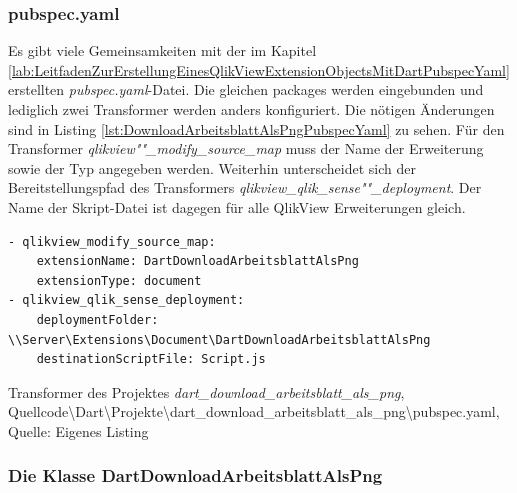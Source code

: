 \subsubsection{pubspec.yaml}

Es gibt viele Gemeinsam\-keiten mit der im Kapitel \ref{lab:LeitfadenZurErstellungEinesQlikViewExtensionObjectsMitDartPubspecYaml} erstellten \textit{pubspec.yaml}-Datei. Die gleichen packages werden eingebunden und lediglich zwei Transformer werden anders konfiguriert. Die nötigen Änderungen sind in Listing \ref{lst:DownloadArbeitsblattAlsPngPubspecYaml} zu sehen. Für den Transformer \textit{qlikview""\_modify\_source\_map} muss der Name der Erweiterung sowie der Typ angegeben werden. Weiterhin unterscheidet sich der Bereitstellungspfad des Transformers \textit{qlikview\_qlik\_sense""\_deployment}. Der Name der Skript-Datei ist dagegen für alle QlikView Erweiterungen gleich.

\begin{listing}[htbp]
\begin{verbatim}
- qlikview_modify_source_map:
    extensionName: DartDownloadArbeitsblattAlsPng
    extensionType: document
- qlikview_qlik_sense_deployment:
    deploymentFolder: \\Server\Extensions\Document\DartDownloadArbeitsblattAlsPng
    destinationScriptFile: Script.js
\end{verbatim}
\caption[Transformer des Projektes \textit{dart\_download\_arbeitsblatt\_als\_png}]{Transformer des Projektes \textit{dart\_download\_arbeitsblatt\_als\_png}, \\Quellcode\textbackslash{}Dart\textbackslash{}Projekte\textbackslash{}dart\_download\_arbeitsblatt\_als\_png\textbackslash{}pubspec.yaml, \\Quelle: Eigenes Listing}
\label{lst:DownloadArbeitsblattAlsPngPubspecYaml}
\end{listing}

\subsubsection{Die Klasse DartDownloadArbeitsblattAlsPng}

